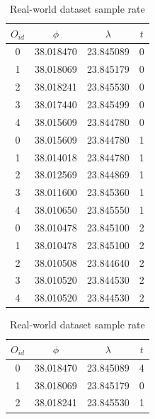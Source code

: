 \begin{table}
    \centering
    \begin{minipage}{0.5\textwidth}
        \centering
        \caption{Ideal dataset sample rate}
        \label{tbl:ideal_rate}
        \begin{tabular}{c c c c}
            \toprule
            \textbf{$O_{id}$} & \textbf{$\phi$} & \textbf{$\lambda$} & \textbf{$t$} \\
            \toprule
            0 & 38.018470 & 23.845089 & 0 \\
            1 & 38.018069 & 23.845179 & 0 \\
            2 & 38.018241 & 23.845530 & 0 \\
            3 & 38.017440 & 23.845499 & 0 \\
            4 & 38.015609 & 23.844780 & 0 \\
            \bottomrule
            0 & 38.015609 & 23.844780 & 1 \\
            1 & 38.014018 & 23.844780 & 1 \\
            2 & 38.012569 & 23.844869 & 1 \\
            3 & 38.011600 & 23.845360 & 1 \\
            4 & 38.010650 & 23.845550 & 1 \\
            \bottomrule
            0 & 38.010478 & 23.845100 & 2 \\
            1 & 38.010478 & 23.845100 & 2 \\
            2 & 38.010508 & 23.844640 & 2 \\
            3 & 38.010520 & 23.844530 & 2 \\
            4 & 38.010520 & 23.844530 & 2 \\
            \bottomrule
        \end{tabular}
    \end{minipage}%
    \hfill
    \begin{minipage}{0.5\textwidth}
        \centering
        \caption{Real-world dataset sample rate}
        \label{tbl:real_rate}
        \begin{tabular}{c c c c}
            \toprule
            \textbf{$O_{id}$} & \textbf{$\phi$} & \textbf{$\lambda$} & \textbf{$t$} \\
            \toprule
            0 & 38.018470 & 23.845089 & 4 \\
            1 & 38.018069 & 23.845179 & 0 \\
            2 & 38.018241 & 23.845530 & 1 \\

\end{tabular}
\end{minipage}
\end{table}
